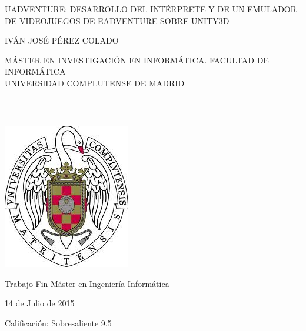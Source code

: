\begin{center}

   \vspace{1cm}


   {\Large UADVENTURE: DESARROLLO DEL INTÉRPRETE Y DE UN EMULADOR DE VIDEOJUEGOS DE EADVENTURE SOBRE UNITY3D}\\

   \vspace{0.5cm}



   \vspace{0.5cm}



   {\large IVÁN JOSÉ PÉREZ COLADO}\\

   \vspace{0.5cm}




   MÁSTER EN INVESTIGACIÓN EN INFORMÁTICA. FACULTAD DE INFORMÁTICA\\
   UNIVERSIDAD COMPLUTENSE DE MADRID \\


   \vspace{0.65cm}
   \rule{2in}{0.5pt}\\
   \vspace{0.85cm}

  \includegraphics[height=2.5in]{figures/escudo.jpg}
  

   \vspace{0.5cm}
Trabajo Fin Máster en Ingeniería Informática

   \vspace{0.5cm}






  14 de Julio de 2015
   \vspace{1cm}
   
   Calificación: Sobresaliente 9.5
   \vspace{1cm}

\end{center}

